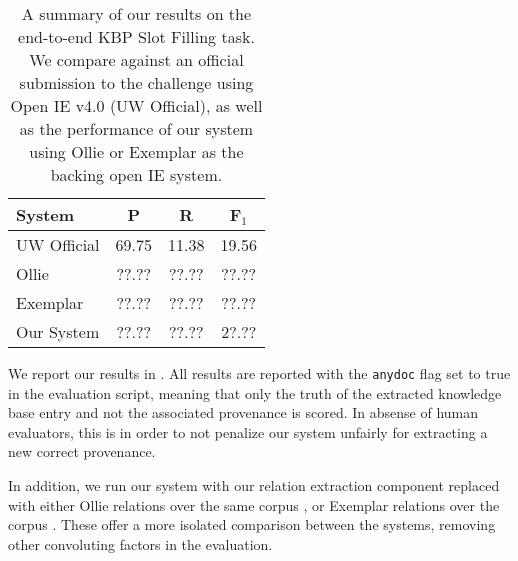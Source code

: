 \begin{table}
\begin{center}
\begin{tabular}{l|cc:c}
\textbf{System} & \textbf{P} & \textbf{R} & \textbf{F$_1$} \\
\hline
UW Official & 69.75 & 11.38 & 19.56 \\
Ollie       & ??.?? & ??.?? & ??.?? \\
Exemplar    & ??.?? & ??.?? & ??.?? \\
\hline
Our System  & ??.?? & ??.?? & 2?.?? \\
\end{tabular}
\end{center}
\caption{\label{tab:results}
A summary of our results on the end-to-end KBP Slot Filling task.
We compare against an official submission to the challenge using
  Open IE v4.0 (UW Official), as well as the performance of our system
  using Ollie or Exemplar as the backing open IE system.
}
\end{table}

We report our results in .
All results are reported with the \texttt{anydoc} flag set to true
  in the evaluation script, meaning that only the truth of the extracted
  knowledge base entry and not the associated provenance is scored.
In absense of human evaluators, this is in order to not penalize our 
  system unfairly for extracting a new correct provenance.

In addition, we run our system with our relation extraction component replaced
  with either Ollie relations over the same corpus \cite{key:2012mausam-ollie},
  or Exemplar relations over the corpus \cite{key:2013mesquita-exemplar}.
These offer a more isolated comparison between the systems, removing
  other convoluting factors in the evaluation.
